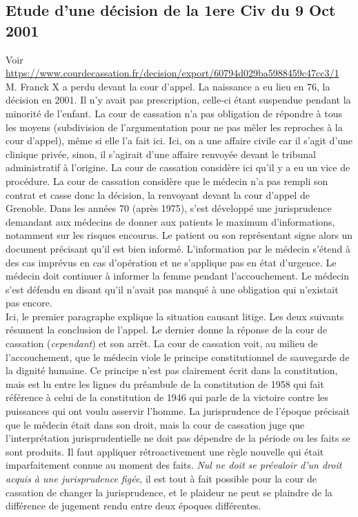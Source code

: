 \documentclass[math]{cours}
\begin{document}
\subsection{Etude d'une décision de la 1ere Civ du 9 Oct 2001}
Voir \url{https://www.courdecassation.fr/decision/export/60794d029ba5988459c47cc3/1}\\
	M. Franck X a perdu devant la cour d'appel.
	La naissance a eu lieu en 76, la décision en 2001. Il n'y avait pas prescription, celle-ci étant suspendue pendant la minorité de l'enfant.
	La cour de cassation n'a pas obligation de répondre à tous les moyens (subdivision de l'argumentation pour ne pas mêler les reproches à la cour d'appel), même si elle l'a fait ici.
	Ici, on a une affaire civile car il s'agit d'une clinique privée, sinon, il s'agirait d'une affaire renvoyée devant le tribunal administratif à l'origine.
	La cour de cassation considère ici qu'il y a eu un vice de procédure.
	La cour de cassation considère que le médecin n'a pas rempli son contrat et casse donc la décision, la renvoyant devant la cour d'appel de Grenoble.
	Dans les années 70 (après 1975), s'est développé une jurisprudence demandant aux médecins de donner aux patients le maximum d'informations, notamment sur les risques encourus.
	Le patient ou son représentant signe alors un document précisant qu'il est bien informé.
	L'information par le médecin s'étend à des cas imprévus en cas d'opération et ne s'applique pas en état d'urgence.
	Le médecin doit continuer à informer la femme pendant l'accouchement.
	Le médecin s'est défendu en disant qu'il n'avait pas manqué à une obligation qui n'existait pas encore.\\

	Ici, le premier paragraphe explique la situation causant litige.
	Les deux suivants résument la conclusion de l'appel.
	Le dernier donne la réponse de la cour de cassation (\textit{cependant}) et son arrêt.
	La cour de cassation voit, au milieu de l'accouchement, que le médecin viole le principe constitutionnel de sauvegarde de la dignité humaine.
	Ce principe n'est pas clairement écrit dans la constitution, mais est lu entre les lignes du préambule de la constitution de 1958 qui fait référence à celui de la constitution de 1946 qui parle de la victoire contre les puissances qui ont voulu asservir l'homme.
	La jurisprudence de l'époque précisait que le médecin était dans son droit, mais la cour de cassation juge que l'interprétation jurisprudentielle ne doit pas dépendre de la période ou les faits se sont produits.
	Il faut appliquer rétroactivement une règle nouvelle qui était imparfaitement connue au moment des faits.
	\textit{Nul ne doit se prévaloir d'un droit acquis à une jurisprudence figée}, il est tout à fait possible pour la cour de cassation de changer la jurisprudence,
	et le plaideur ne peut se plaindre de la différence de jugement rendu entre deux époques différentes.
\end{document}
